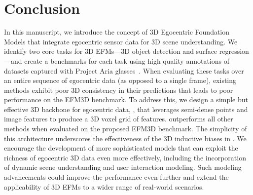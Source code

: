 \section{Conclusion}

In this manuscript, we introduce the concept of 3D Egocentric Foundation Models that integrate egocentric sensor data for 3D scene understanding. We identify two core tasks for 3D EFMs---3D object detection and surface regression---and create a benchmarks for each task using high quality annotations of datasets captured with Project Aria glasses~\cite{engel2023project}. When evaluating these tasks over an entire sequence of egocentric data (as opposed to a single frame), existing methods exhibit poor 3D consistency in their predictions that leads to poor performance on the EFM3D benchmark. To address this, we design a simple but effective 3D backbone for egocentric data, \EFMmodel{}, that leverages semi-dense points and image features to produce a 3D voxel grid of features. \EFMmodel{} outperforms all other methods when evaluated on the proposed EFM3D benchmark.
The simplicity of this architecture underscores the effectiveness of the 3D inductive biases in \EVL{}. 
We encourage the development of more sophisticated models that can exploit the richness of egocentric 3D data even more effectively, including the incorporation of dynamic scene understanding and user interaction modeling. Such modeling advancements could improve the performance even further and extend the applicability of 3D EFMs to a wider range of real-world scenarios.
